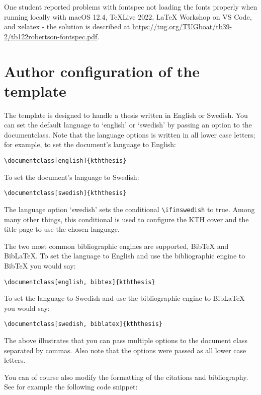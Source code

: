 \documentclass[examplethesis.tex]{subfiles}
\begin{document}
One student reported problems with fontspec not loading the fonts properly when running locally with macOS 12.4, TeXLive 2022, LaTeX Workshop on VS Code, and xelatex - the solution is described at \url{https://tug.org/TUGboat/tb39-2/tb122robertson-fontspec.pdf}.


\section{Author configuration of the template}
\label{sec:authorConfigs}
The template is designed to handle a thesis written in English or Swedish.
You can set the default language to `english' or `swedish' by passing an option to the documentclass. Note that the language options is written in all lower case letters; for example, to set the document's language to English:
\begin{lstlisting}[style=latexExampleForAuthors]
\documentclass[english]{kththesis}
\end{lstlisting}

To set the document's language to Swedish:
\begin{lstlisting}[style=latexExampleForAuthors]
\documentclass[swedish]{kththesis}
\end{lstlisting}

The language option `swedish' sets the conditional \texttt{\textbackslash ifinswedish} to true.  Among many other things, this conditional is used to configure the KTH cover and the title page to use the chosen language.

The two most common bibliographic engines are supported, \ie BibTeX and BibLaTeX. To set the language to English and use the bibliographic engine to BibTeX you would say:
\begin{lstlisting}[style=latexExampleForAuthors]
\documentclass[english, bibtex]{kththesis}
\end{lstlisting}
To set the language to Swedish and use the bibliographic engine to BibLaTeX you would say:
\begin{lstlisting}[style=latexExampleForAuthors]
\documentclass[swedish, biblatex]{kththesis}
\end{lstlisting}

The above illustrates that you can pass multiple options to the document class separated by commas. Also note that the options were passed as all lower case letters.

You can of course also modify the formatting of the citations and bibliography. See for example the following code snippet:
\end{document}
